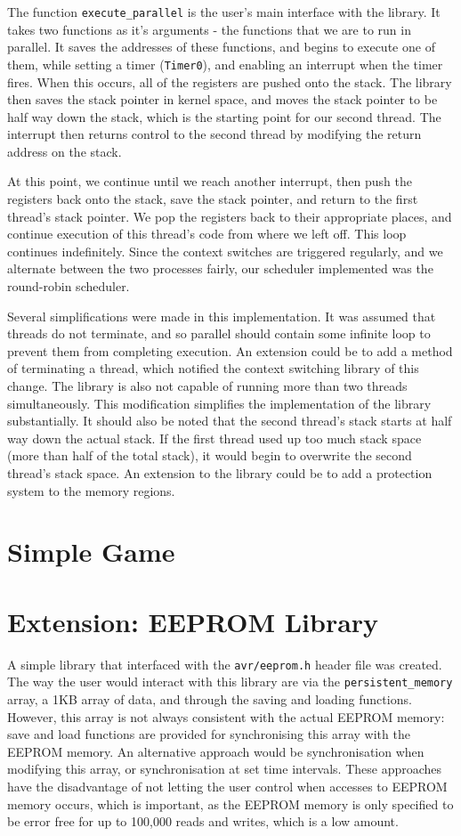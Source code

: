 \documentclass[a4paper,10pt]{article}
\begin{document}
The function \texttt{execute\_parallel} is the user's main interface with the
library. It takes two functions as it's arguments - the functions that we are
to run in parallel. It saves the addresses of these functions, and begins to
execute one of them, while setting a timer (\texttt{Timer0}), and enabling an
interrupt when the timer fires. When this occurs, all of the registers are
pushed onto the stack. The library then saves the stack pointer in kernel
space, and moves the stack pointer to be half way down the stack, which is the
starting point for our second thread.  The interrupt then returns control to
the second thread by modifying the return address on the stack.

At this point, we continue until we reach another interrupt, then push the
registers back onto the stack, save the stack pointer, and return to the first
thread's stack pointer. We pop the registers back to their appropriate places,
and continue execution of this thread's code from where we left off.  This
loop continues indefinitely. Since the context switches are triggered
regularly, and we alternate between the two processes fairly, our scheduler
implemented was the round-robin scheduler.

Several simplifications were made in this implementation. It was assumed that
threads do not terminate, and so parallel should contain some infinite loop to
prevent them from completing execution. An extension could be to add a method
of terminating a thread, which notified the context switching library of this
change.  The library is also not capable of running more than two threads
simultaneously. This modification simplifies the implementation of the library
substantially.
It should also be noted that the second thread's stack starts at half way down
the actual stack. If the first thread used up too much stack space (more than
half of the total stack), it would begin to overwrite the second thread's
stack space. An extension to the library could be to add a protection system
to the memory regions.

\section*{Simple Game}

\section*{Extension: EEPROM Library}
A simple library that interfaced with the \texttt{avr/eeprom.h} header file
was created. The way the user would interact with this library are via the
\texttt{persistent\_memory} array, a 1KB array of data, and through the saving
and loading functions. However, this array is not always consistent with the
actual EEPROM memory: save and load functions are provided for synchronising
this array with the EEPROM memory. An alternative approach would be
synchronisation when modifying this array, or synchronisation at set time
intervals. These approaches have the disadvantage of not letting the user
control when accesses to EEPROM memory occurs, which is important, as the
EEPROM memory is only specified to be error free for up to 100,000 reads and
writes, which is a low amount.
\end{document}
